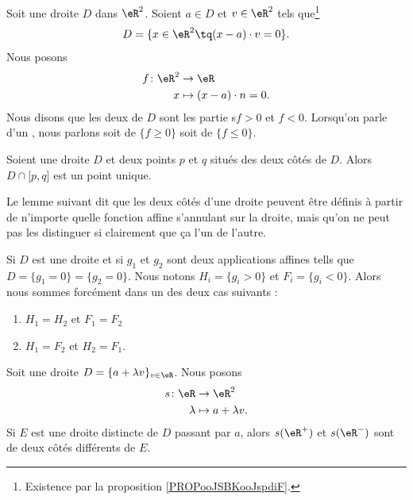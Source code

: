 \begin{definition}	\label{DEFooTMHLooOufwGg}
	Soit une droite \( D\) dans \( \eR^2\). Soient \( a\in D\) et \( v\in \eR^2\) tels que\footnote{Existence par la proposition \ref{PROPooJSBKooJspdiF}.}
	\begin{equation}
		D=\{ x\in \eR^2\tq (x-a)\cdot v=0 \}.
	\end{equation}
	Nous posons
	\begin{equation}		\label{EQooZJQLooIOiXVR}
		\begin{aligned}
			f\colon \eR^2 & \to \eR                      \\
			x             & \mapsto     (x-a)\cdot n=0 .
		\end{aligned}
	\end{equation}
	Nous disons que les deux  de \( D\) sont les partie s\( f>0\) et \( f<0\). Lorsqu'on parle d'un , nous parlons soit de \( \{ f\geq 0 \}\) soit de \( \{ f\leq 0 \}\).
\end{definition}

\begin{proposition}	\label{PROPooNEKPooLyxqOh}
	Soient une droite \( D\) et deux points \( p\) et \( q\) situés des deux côtés de \( D\). Alors \( D\cap\mathopen[ p,q\mathclose]\) est un point unique.
\end{proposition}


Le lemme suivant dit que les deux côtés d'une droite peuvent être définis à partir de n'importe quelle fonction affine s'annulant sur la droite, mais qu'on ne peut pas les distinguer si clairement que ça l'un de l'autre.
\begin{lemma}	\label{LEMooPMOTooSSgVhz}
	Si \( D\) est une droite et si \( g_1\) et \( g_2\) sont deux applications affines tells que \( D=\{ g_1=0 \}=\{ g_2=0 \}\). Nous notons \( H_i=\{ g_i>0 \}\) et \( F_i=\{ g_i<0 \}\). Alors nous sommes forcément dans un des deux cas suivants :
	\begin{enumerate}
		\item
		      \( H_1=H_2\) et \( F_1=F_2\)
		\item
		      \( H_1=F_2\) et \( H_2=F_1\).
	\end{enumerate}
\end{lemma}


\begin{lemma}	\label{LEMooYPZZooBEOsYq}
	Soit une droite \( D=\{ a+\lambda v \}_{v\in \eR}\). Nous posons
	\begin{equation}
		\begin{aligned}
			s\colon \eR & \to \eR^2            \\
			\lambda     & \mapsto a+\lambda v.
		\end{aligned}
	\end{equation}
	Si \( E\) est une droite distincte de \( D\) passant par \( a\), alors \( s(\eR^+)\) et \( s(\eR^-)\) sont de deux côtés différents de \( E\).
\end{lemma}

